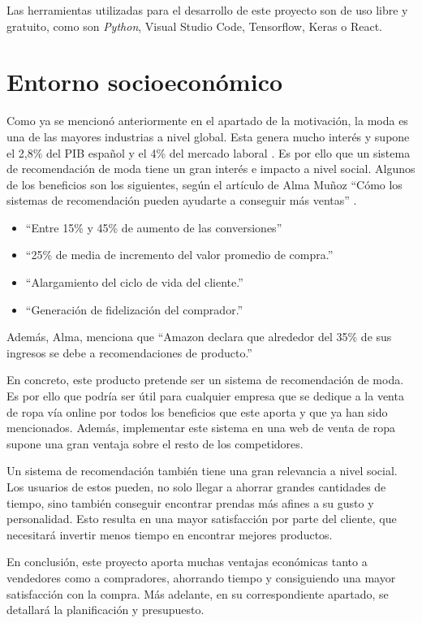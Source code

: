 \documentclass[12pt]{report} %
\begin{document}
	Las herramientas utilizadas para el desarrollo de este proyecto son de uso libre y gratuito, como son \textit{Python},
	Visual Studio Code, Tensorflow, Keras o React.
	\section{Entorno socioeconómico}
	Como ya se mencionó anteriormente en el apartado de la motivación, la moda es una de las mayores industrias a nivel global.
	Esta genera mucho interés y supone el 2,8\% del PIB español y el 4\% del mercado laboral \cite{estadisticas-moda}. Es por ello
	que un sistema de recomendación de moda tiene un gran interés e impacto a nivel social. Algunos de los beneficios son los siguientes,
	según el artículo de Alma Muñoz ``Cómo los sistemas de recomendación pueden ayudarte a conseguir más ventas'' \cite{alma}.
	\begin{itemize}
		\item ``Entre 15\% y 45\% de aumento de las conversiones''
		\item ``25\% de media de incremento del valor promedio de compra.''
		\item ``Alargamiento del ciclo de vida del cliente.''
		\item ``Generación de fidelización del comprador.''
	\end{itemize}


	Además, Alma, menciona que ``Amazon declara que alrededor del 35\% de sus ingresos se debe a recomendaciones de producto.''


	En concreto, este producto pretende ser un sistema de recomendación de moda. Es por ello que podría ser útil para cualquier empresa
	que se dedique a la venta de ropa vía online por todos los beneficios que este aporta y que ya han sido mencionados.
	Además, implementar este sistema en una web de venta de ropa supone una gran ventaja sobre el resto de los competidores.
	
	Un sistema de recomendación también tiene una gran relevancia a nivel social. Los usuarios de estos pueden, no solo llegar
	a ahorrar grandes cantidades de tiempo, sino también conseguir encontrar prendas más afines a su gusto y personalidad. Esto
	resulta en una mayor satisfacción por parte del cliente, que necesitará invertir menos tiempo en encontrar mejores productos.


	En conclusión, este proyecto aporta muchas ventajas económicas tanto a vendedores como a compradores, ahorrando tiempo
	y consiguiendo una mayor satisfacción con la compra. Más adelante, en su correspondiente apartado, se detallará la planificación y presupuesto.
\end{document}
